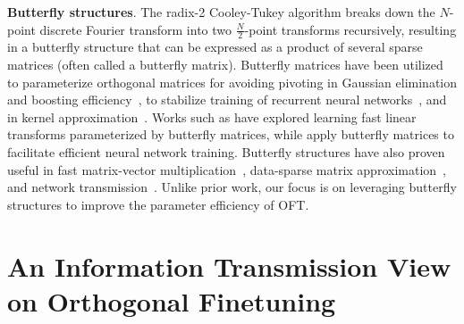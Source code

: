 \textbf{Butterfly structures}. The radix-2 Cooley-Tukey algorithm breaks down the $N$-point discrete Fourier transform into two $\frac{N}{2}$-point transforms recursively, resulting in a butterfly structure that can be expressed as a product of several sparse matrices (often called a butterfly matrix). Butterfly matrices have been utilized to parameterize orthogonal matrices for avoiding pivoting in Gaussian elimination and boosting efficiency~\cite{parker1995random}, to stabilize training of recurrent neural networks~\cite{jing2017tunable}, and in kernel approximation~\cite{munkhoeva2018quadrature}. Works such as \cite{dao2019learning,dao2019kaleidoscope} have explored learning fast linear transforms parameterized by butterfly matrices, while \cite{chen2022pixelated,dao2022monarch} apply butterfly matrices to facilitate efficient neural network training. Butterfly structures have also proven useful in fast matrix-vector multiplication~\cite{michielssen1996multilevel,o2010algorithm}, data-sparse matrix approximation~\cite{li2015butterfly}, and network transmission~\cite{klasing1994broadcasting,li2003linear,rajasingh2016transmission}. Unlike prior work, our focus is on leveraging butterfly structures to improve the parameter efficiency of OFT.

\section{An Information Transmission View on Orthogonal Finetuning}

